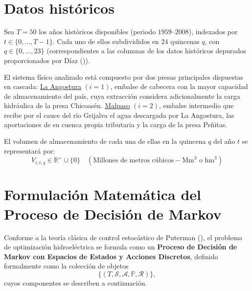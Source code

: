 \documentclass[
  spanish,
  letterpaper,
]{scrreprt}
\theoremstyle{definition}
\theoremstyle{remark}
\begin{document}
\section{Datos históricos}\label{sec-datos-historicos}

Sea \(T = 50\) los años históricos disponibles (periodo \(1959–2008\)),
indexados por \(t \in \{0, \dots, T - 1\}\). Cada uno de ellos
subdivididos en \(24\) quincenas \(q\), con \(q \in \{0, \dots, 23\}\)
(correspondientes a las columnas de los datos históricos depurados
proporcionados por Díaz ()).

El sistema físico analizado está compuesto por dos presas principales
dispuestas en cascada:
\href{https://maps.app.goo.gl/NHNQdHdfYAoRGxhPA}{La Angostura}
\((i = 1)\), embalse de cabecera con la mayor capacidad de
almacenamiento del país, cuya extracción considera adicionalmente la
carga hidráulica de la presa Chicoasén.
\href{https://maps.app.goo.gl/acX7hVXswX5uYYUBA}{Malpaso} \((i =2)\),
embalse intermedio que recibe por el cauce del río Grijalva el agua
descargada por La Angostura, las aportaciones de su cuenca propia
tributaria y la carga de la presa Peñitas.

El volumen de almacenamiento de cada una de ellas en la quincena \(q\)
del año \(t\) se representará por:
\[V_{i,t,q} \in \mathbb{R}^+ \cup \{0\} \quad (\text{Millones de metros cúbicos} - \text{Mm}^3 \text{ o hm}^3)\]

\section{Formulación Matemática del Proceso de Decisión de
Markov}\label{sec-mdp}

Conforme a la teoría clásica de control estocástico de Puterman
(), el problema de optimización
hidroeléctrica se formula como un \textbf{Proceso de Decisión de Markov
con Espacios de Estados y Acciones Discretos}, definido formalmente como
la colección de objetos
\[\{(T, \mathcal{S}, \mathcal{A}, \mathbb{P}, \mathcal{R})\},\] cuyos
componentes se describen a continuación.
\end{document}
